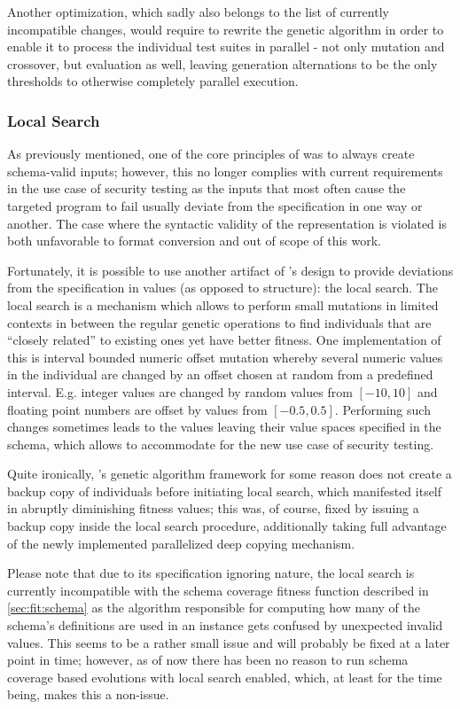 Another optimization, which sadly also belongs to the list of currently incompatible changes, would require to
rewrite the genetic algorithm in order to enable it to process the individual test suites in parallel -
not only mutation and crossover, but evaluation as well, leaving generation alternations to be the only
thresholds to otherwise completely parallel execution.
\subsubsection{Local Search}
\label{sec:local}
As previously mentioned, one of the core principles of \xmlmate was to always create schema-valid inputs; 
however, this no longer complies with current requirements in the use case of security testing as the 
inputs that most often cause the targeted program to fail usually deviate from the specification in 
one way or another. The case where the syntactic validity of the \xml representation is violated is 
both unfavorable to format conversion and out of scope of this work.

Fortunately, it is possible to use another artifact of \evosuite's design to provide deviations from the 
specification in values (as opposed to structure): the local search. 
The local search is a mechanism which allows to perform small mutations in limited contexts in between 
the regular genetic operations to find individuals that are ``closely related'' to existing ones
yet have better fitness. One implementation of this is interval bounded numeric offset mutation whereby
several numeric values in the individual are changed by an offset chosen at random from a predefined 
interval. E.g. integer values are changed by random values from $[-10,10]$ and floating point numbers 
are offset by values from $[-0.5,0.5]$.
Performing such changes sometimes leads to the values leaving their value spaces specified in the schema, 
which allows to accommodate for the new use case of security testing.

Quite ironically, \evosuite's genetic algorithm framework for some reason does not create a backup 
copy of individuals before initiating local search, which manifested itself in abruptly diminishing 
fitness values; this was, of course, fixed by issuing a backup copy inside the local search procedure, 
additionally taking full advantage of the newly implemented parallelized deep copying mechanism.

Please note that due to its specification ignoring nature, the local search is currently incompatible with the
schema coverage fitness function described in \cref{sec:fit:schema} as the algorithm responsible for computing
how many of the schema's definitions are used in an \xml instance gets confused by unexpected invalid values.
This seems to be a rather small issue and will probably be fixed at a later point in time; however, as of now
there has been no reason to run schema coverage based evolutions with local search enabled, which, at least for
the time being, makes this a non-issue.

